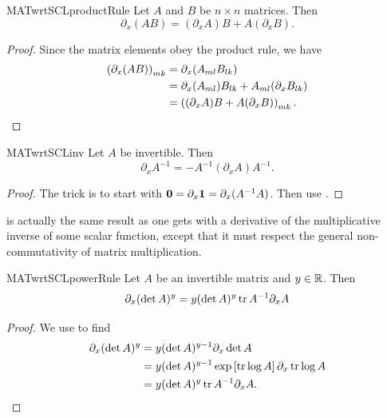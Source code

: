 \begin{proposition}{}{MATwrtSCLproductRule}
  Let $A$ and $B$ be $n\times n$ matrices. Then
  $$
    \partial_x(AB)=(\partial_x A)B+A(\partial_x B).
  $$
  \begin{proof}
    Since the matrix elements obey the product
    rule, we have
    \begin{equation*}
      \begin{aligned}
        \left(\partial_x(AB)\right)_{mk}
          &=\partial_x(A_{ml}B_{lk})\\
          &=\partial_x(A_{ml})B_{lk}
                            +A_{ml}(\partial_x B_{lk})\\
          &=\left((\partial_x A)B+A(\partial_x B)\right)_{mk}.
      \end{aligned}
    \end{equation*}
  \end{proof}
\end{proposition}

\begin{proposition}{}{MATwrtSCLinv}
Let $A$ be invertible. Then
$$
\partial_x A^{-1}=-A^{-1}\left(\partial_x A \right)A^{-1}.
$$
\begin{proof}
The trick is to start with ${\mathbf 0}=\partial_x{\mathbf 1}=\partial_x(A^{-1}A)$.
Then use . 
\end{proof}
\end{proposition}
 is actually
the same result as one gets with a derivative of the multiplicative
inverse of some scalar function, except that it must respect
 the general non-commutativity of matrix multiplication.

\begin{proposition}{}{MATwrtSCLpowerRule}
Let $A$ be an invertible matrix and $y\in\mathbb{R}$. Then
$$
\partial_x(\det A)^y=
y(\det A)^y \tr A^{-1}\partial_x A
$$ 
\begin{proof}
We use  to find
\begin{equation*}\begin{aligned}
  \partial_x(\det A)^y &= y(\det A)^{y-1}\partial_x\det A\\
      &= y(\det A)^{y-1}\exp\left[\tr\log A\right]\partial_x\tr\log A\\
      &= y(\det A)^y \tr A^{-1}\partial_x A.
\end{aligned}\end{equation*}
\end{proof}
\end{proposition}

